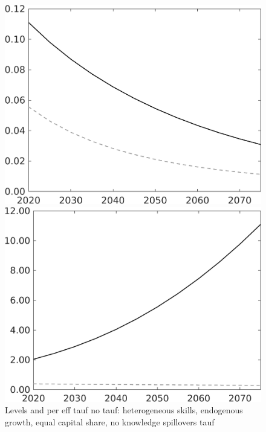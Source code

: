 \documentclass[12pt]{article}
\begin{document}
\begin{figure}
	\centering
	\caption{Levels and per eff tauf no tauf: heterogeneous skills, endogenous growth, equal capital share, no knowledge spillovers tauf}\label{fig:Leveltauf_nsk0_xgr0_equalcapShare_noknow_withtaul2}
	
	\begin{minipage}[]{0.32\textwidth}
		\includegraphics[width=1\textwidth]{../../codding_model/own_basedOnFried/optimalPol_010922_revision/figures/all_13Sept22/LevTaufNoTauf_TaulCalib_Equlab_regime0_pepn_spillover0_nsk0_xgr0_knspil1_sep1_LFlimit0_emsbase0_countec0_GovRev0_etaa0.79_lgd0.png}
	\end{minipage}	
	\begin{minipage}[]{0.32\textwidth}
		\includegraphics[width=1\textwidth]{../../codding_model/own_basedOnFried/optimalPol_010922_revision/figures/all_13Sept22/LevTaufNoTauf_TaulCalib_Equlab_regime0_LgLf_spillover0_nsk0_xgr0_knspil1_sep1_LFlimit0_emsbase0_countec0_GovRev0_etaa0.79_lgd0.png}

\end{minipage}
\end{figure}
\end{document}
